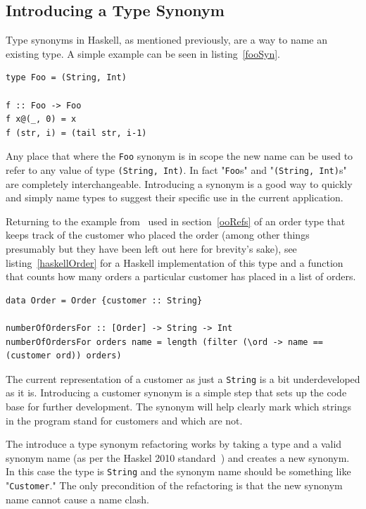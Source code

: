 \subsection{Introducing a Type Synonym}\label{introSyn}

Type synonyms in Haskell, as mentioned previously, are a way to name an existing type. A simple example can be seen in listing~\ref{fooSyn}. 

\begin{lstlisting}[label=fooSyn,caption={A simple type synonym.}]
type Foo = (String, Int)

f :: Foo -> Foo
f x@(_, 0) = x
f (str, i) = (tail str, i-1) 
\end{lstlisting}

Any place that where the \texttt{Foo} synonym is in scope the new name can be used to refer to any value of type \texttt{(String, Int)}. In fact "\texttt{Foo}s" and "\texttt{(String, Int)}s" are completely interchangeable. Introducing a synonym is a good way to quickly and simply name types to suggest their specific use in the current application.

Returning to the example from~\citep{fowler} used in section~\ref{ooRefs} of an order type that keeps track of the customer who placed the order (among other things presumably but they have been left out here for brevity's sake), see listing~\ref{haskellOrder} for a Haskell implementation of this type and a function that counts how many orders a particular customer has placed in a list of orders.

\begin{lstlisting}[label=haskellOrder,caption={An order algebraic data type.}]
data Order = Order {customer :: String}

numberOfOrdersFor :: [Order] -> String -> Int
numberOfOrdersFor orders name = length (filter (\ord -> name == (customer ord)) orders)
\end{lstlisting}

The current representation of a customer as just a \texttt{String} is a bit underdeveloped as it is. Introducing a customer synonym is a simple step that sets up the code base for further development. The synonym will help clearly mark which strings in the program stand for customers and which are  not.

The introduce a type synonym refactoring works by taking a type and a valid synonym name (as per the Haskel 2010 standard~\citep{haskell2010}) and creates a new synonym. In this case the type is \texttt{String} and the synonym name should be something like "\texttt{Customer}." The only precondition of the refactoring is that the new synonym name cannot cause a name clash. 

